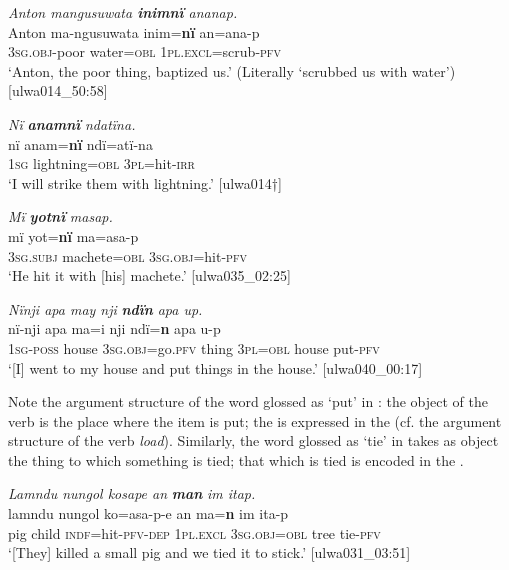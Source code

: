 \ea%
    \label{ex:clause:62}
          \textit{Anton mangusuwata \textbf{inimnï} ananap.}\\
\gll    Anton  ma-ngusuwata  inim=\textbf{nï}  an=ana-p\\
    [name]  \textsc{3sg.obj-}poor  water=\textsc{obl}  \textsc{1pl.excl}=scrub-\textsc{pfv}\\
\glt `Anton, the poor thing, baptized us.’ (Literally ‘scrubbed us with water’) [ulwa014\_50:58]
\z

\ea%
    \label{ex:clause:63}
          \textit{Nï} \textbf{\textit{anamnï}} \textit{ndatïna.}\\
\gll    nï    anam=\textbf{nï}    ndï=atï-na\\
    1\textsc{sg}  lightning=\textsc{obl}  3\textsc{pl}=hit-\textsc{irr}\\
\glt `I will strike them with lightning.’ [ulwa014†]
\z

\ea%
    \label{ex:clause:64}
          \textit{Mï} \textbf{\textit{yotnï}} \textit{masap.}\\
\gll    mï      yot=\textbf{nï}      ma=asa-p\\
    3\textsc{sg.subj}  machete=\textsc{obl}  \textsc{3sg.obj}=hit-\textsc{pfv}\\
\glt `He hit it with [his] machete.’ [ulwa035\_02:25]
\z

\ea%
    \label{ex:clause:65}
          \textit{Nïnji apa may nji} \textbf{\textit{ndïn}} \textit{apa up.}\\
\gll    nï-nji    apa    ma=i        nji    ndï=\textbf{n}    apa u-p\\
    \textsc{1sg-poss}  house  \textsc{3sg.obj}=go.\textsc{pfv}  thing  3\textsc{pl=obl}  house    put-\textsc{pfv}\\
\glt    ‘[I] went to my house and put things in the house.’ [ulwa040\_00:17]
\z

Note the argument structure of the word glossed as ‘put’ in : the object of the verb is the place where the item is put; the  is expressed in the   (cf. the argument structure of the  verb \textit{load}). Similarly, the word glossed as ‘tie’ in  takes as object the thing to which something is tied; that which is tied is encoded in the  .

\ea%
    \label{ex:clause:66}
          \textit{Lamndu nungol kosape an} \textbf{\textit{man}} \textit{im itap.}\\
\gll    lamndu  nungol  ko=asa-p-e    an      ma=\textbf{n}      im     ita-p\\
    pig      child  \textsc{indf}=hit-\textsc{pfv-dep}  \textsc{1pl.excl}  \textsc{3sg.obj=obl}  tree     tie-\textsc{pfv}\\
\glt `[They] killed a small pig and we tied it to stick.’ [ulwa031\_03:51]
\z

